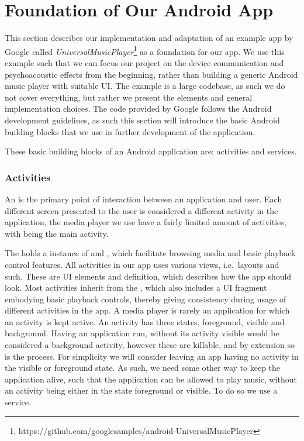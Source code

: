 \section{Foundation of Our Android App}\label{sec:foundation_of_our_android_app}
This section describes our implementation and adaptation of an example app by Google called \textit{UniversalMusicPlayer}\footnote{https://github.com/googlesamples/android-UniversalMusicPlayer} as a foundation for our app.
We use this example such that we can focus our project on the device communication and psychoacoustic effects from the beginning, rather than building a generic Android music player with suitable \ac{UI}.
The example is a large codebase, as such we do not cover everything, but rather we present the elements and general implementation choices.
The code provided by Google follows the Android development guidelines, as such this section will introduce the basic Android building blocks that we use in further development of the application.

These basic building blocks of an Android application are: activities and services.

\subsubsection{Activities}\label{subsec:activities}
An  is the primary point of interaction between an application and user.
Each different screen presented to the user is considered a different activity in the application, the media player we use have a fairly limited amount of activities, with  being the main activity.

The  holds a instance of  and , which facilitate browsing media and basic playback control features.
All activities in our app uses various views, i.e.~layouts and such. These are \ac{UI} elements and definition, which describes how the app should look.
Most activities inherit from the , which also includes a \ac{UI} fragment embodying basic playback controls, thereby giving consistency during usage of different activities in the app.
A media player is rarely an application for which an activity is kept active.
An activity has three states, foreground, visible and background.
Having an application run, without its activity visible would be considered a background activity, however these are killable, and by extension so is the process.
For simplicity we will consider leaving an app having no activity in the visible or foreground state.
As such, we need some other way to keep the application alive, such that the application can be allowed to play music, without an activity being either in the state foreground or visible.
To do so we use a service.


